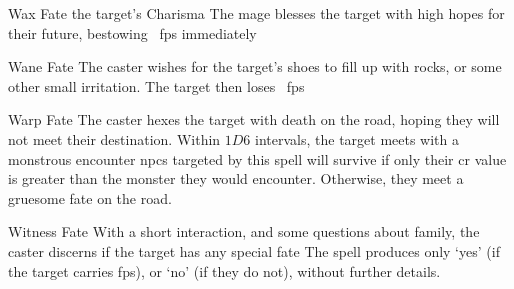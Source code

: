 \ifodd\value{diceNo}

  {}%
  {Wax}%
  {Fate}%
  {the target's Charisma}%
  {The mage blesses the target with high hopes for their future, bestowing \showDam~\glspl{fp} immediately}%
  {}

  {}%
  {Wane}%
  {Fate}%
  {}%
  {The caster wishes for the target's shoes to fill up with rocks, or some other small irritation.
    The target then loses \showDam~\glspl{fp}}%
  {}

\else

  {}%
  {Warp}%
  {Fate}%
  {}%
  {The caster hexes the target with death on the road, hoping they will not meet their destination.
    Within $1D6$ \glspl{interval}, the target meets with a monstrous encounter}%
  {
    \Glspl{npc} targeted by this spell will survive if only their \gls{cr} value is greater than the monster they would encounter.
    Otherwise, they meet a gruesome fate on the road.
  }

  {}%
  {Witness}%
  {Fate}%
  {}%
  {With a short interaction, and some questions about family, the caster discerns if the target has any special fate}%
  {The spell produces only `yes' (if the target carries \glspl{fp}), or `no' (if they do not), without further details.}

\fi
{}
